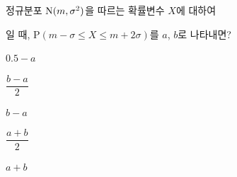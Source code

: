 정규분포 $\mathrm{N}(m{,}\mkern3mu\mathopen{}\sigma^2)$을 따르는 확률변수 $X$에 대하여 \par\smallskip{}\par{}\par\smallskip\noindent 일 때, $\mathrm{P}(m-\sigma\le X\le m+2\sigma)$를 $a$, $b$로 나타내면?
\begin{choices32}{\rule[-3ex]{0pt}{8ex}$0.5-a$}{\rule[-3ex]{0pt}{8ex}$\dfrac{b-a}{2}$}{\rule[-3ex]{0pt}{8ex}$b-a$}{\rule[-3ex]{0pt}{8ex}$\dfrac{a+b}{2}$}{\rule[-3ex]{0pt}{8ex}$a+b$}\end{choices32}

